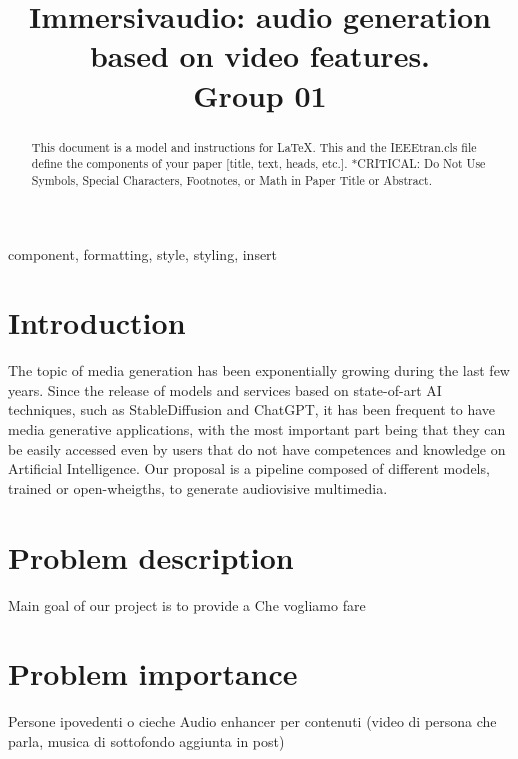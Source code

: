 \documentclass[conference]{IEEEtran}
\begin{document}
\title{Immersivaudio: audio generation based on video features.\\
{\footnotesize Group 01}
}


\author{
\and
{}
\and
{}
}

\maketitle

\begin{abstract}
This document is a model and instructions for \LaTeX.
This and the IEEEtran.cls file define the components of your paper [title, text, heads, etc.]. *CRITICAL: Do Not Use Symbols, Special Characters, Footnotes, 
or Math in Paper Title or Abstract.
\end{abstract}

\begin{IEEEkeywords}
component, formatting, style, styling, insert
\end{IEEEkeywords}

\section{Introduction}
The topic of media generation has been exponentially growing during the last few years. Since the release of models and services based on state-of-art AI techniques, such as StableDiffusion and ChatGPT, it has been frequent to have media generative applications, with the most important part being that they can be easily accessed even by users that do not have competences and knowledge on Artificial Intelligence. 
Our proposal is a pipeline composed of different models, trained or open-wheigths, to generate audiovisive multimedia. 

\section{Problem description}
Main goal of our project is to provide a 
Che vogliamo fare 


\section{Problem importance}

Persone ipovedenti o cieche
Audio enhancer per contenuti (video di persona che parla, musica di sottofondo aggiunta in post)
\end{document}
